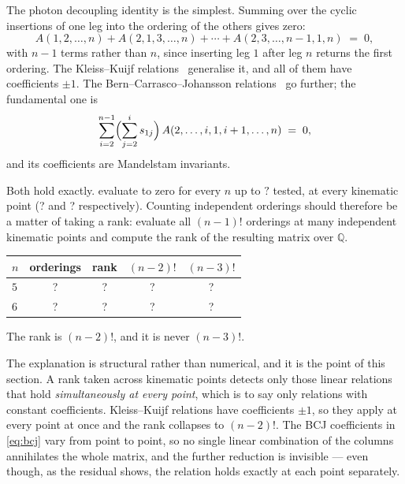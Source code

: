 \documentclass[11pt,a4paper]{article}
\newcommand{\TFRelationMax}{?}\newcommand{\TFUoneZero}{?}
\newcommand{\TFBcjZero}{?}\newcommand{\TFRankFive}{?}
\newcommand{\TFRankSix}{?}\newcommand{\TFOrderingsFive}{?}
\newcommand{\TFOrderingsSix}{?}\newcommand{\TFKKFive}{?}
\newcommand{\TFKKSix}{?}\newcommand{\TFBCJcountFive}{?}
\newcommand{\TFBCJcountSix}{?}\newcommand{\TFRankAgreesFive}{?}
\newcommand{\QQ}{\mathbb{Q}}
\theoremstyle{definition}
\begin{document}
The photon decoupling identity is the simplest. Summing over the cyclic
insertions of one leg into the ordering of the others gives zero:
%
\begin{equation}
A(1,2,\dots,n) + A(2,1,3,\dots,n) + \cdots
+ A(2,3,\dots,n-1,1,n) \;=\; 0 ,
\label{eq:u1}
\end{equation}
%
with $n-1$ terms rather than $n$, since inserting leg $1$ after leg $n$
returns the first ordering. The Kleiss--Kuijf relations~\cite{KleissKuijf1989}
generalise it, and all of them have coefficients $\pm 1$. The
Bern--Carrasco--Johansson relations~\cite{BCJ2008} go further; the
fundamental one is
%
\begin{equation}
\sum_{i=2}^{n-1} \Bigl( \sum_{j=2}^{i} s_{1j} \Bigr)\,
A(2, \dots, i, 1, i+1, \dots, n) \;=\; 0 ,
\label{eq:bcj}
\end{equation}
%
and its coefficients are Mandelstam invariants.

Both hold exactly.  evaluate to zero for every $n$ up to
$\TFRelationMax$ tested, at every kinematic point
(\TFUoneZero{} and \TFBcjZero{} respectively). Counting independent orderings
should therefore be a matter of taking a rank: evaluate all $(n-1)!$ orderings
at many independent kinematic points and compute the rank of the resulting
matrix over $\QQ$.

\begin{center}
\begin{tabular}{lcccc}
\toprule
$n$ & orderings & rank & $(n-2)!$ & $(n-3)!$ \\
\midrule
$5$ & \TFOrderingsFive & \TFRankFive & \TFKKFive & \TFBCJcountFive \\
$6$ & \TFOrderingsSix  & \TFRankSix  & \TFKKSix  & \TFBCJcountSix  \\
\bottomrule
\end{tabular}
\end{center}

\noindent
The rank is $(n-2)!$, and it is never $(n-3)!$.

The explanation is structural rather than numerical, and it is the point of
this section. A rank taken across kinematic points detects only those linear
relations that hold \emph{simultaneously at every point}, which is to say only
relations with constant coefficients. Kleiss--Kuijf relations have
coefficients $\pm 1$, so they apply at every point at once and the rank
collapses to $(n-2)!$. The BCJ coefficients in \cref{eq:bcj} vary from point
to point, so no single linear combination of the columns annihilates the whole
matrix, and the further reduction is invisible --- even though, as the
residual shows, the relation holds exactly at each point separately.
\end{document}
